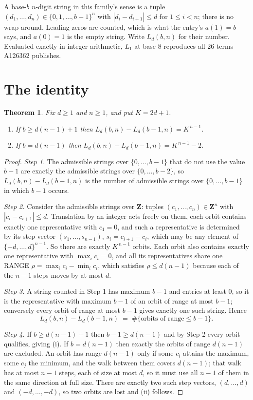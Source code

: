 \documentclass[11pt,a4paper]{article}
\theoremstyle{plain}
\newtheorem{theorem}{Theorem}
\theoremstyle{definition}
\begin{document}
A base-$b$ $n$-digit string in this family's sense is a tuple
$(d_1,\dots,d_n)\in\{0,1,\dots,b-1\}^{n}$ with $|d_i-d_{i+1}|\le d$ for $1\le i<n$; there
is no wrap-around. Leading zeros are counted, which is what the entry's $a(1)=b$ says, and
$a(0)=1$ is the empty string. Write $L_d(b,n)$ for their number. Evaluated exactly in integer
arithmetic, $L_{1}$ at base $8$ reproduces all $26$ terms A126362 publishes.

\section{The identity}

\begin{theorem}
Fix $d\ge1$ and $n\ge1$, and put $K=2d+1$.
\begin{enumerate}
\item[(i)] If $b\ge d(n-1)+1$ then $L_d(b,n)-L_d(b-1,n)=K^{\,n-1}$.
\item[(ii)] If $b=d(n-1)$ then $L_d(b,n)-L_d(b-1,n)=K^{\,n-1}-2$.
\end{enumerate}
\end{theorem}

\begin{proof}
\emph{Step 1.} The admissible strings over $\{0,\dots,b-1\}$ that do not use the value $b-1$
are exactly the admissible strings over $\{0,\dots,b-2\}$, so $L_d(b,n)-L_d(b-1,n)$ is the
number of admissible strings over $\{0,\dots,b-1\}$ in which $b-1$ occurs.

\emph{Step 2.} Consider the admissible strings over $\mathbf{Z}$: tuples
$(c_1,\dots,c_n)\in\mathbf{Z}^{n}$ with $|c_i-c_{i+1}|\le d$. Translation by an integer acts
freely on them, each orbit contains exactly one representative with $c_1=0$, and such a
representative is determined by its step vector $(s_1,\dots,s_{n-1})$, $s_i=c_{i+1}-c_i$,
which may be any element of $\{-d,\dots,d\}^{n-1}$. So there are exactly $K^{\,n-1}$ orbits.
Each orbit also contains exactly one representative with $\max_i c_i=0$, and all its
representatives share one RANGE $\rho=\max_ic_i-\min_ic_i$, which satisfies
$\rho\le d(n-1)$ because each of the $n-1$ steps moves by at most $d$.

\emph{Step 3.} A string counted in Step 1 has maximum $b-1$ and entries at least $0$, so it is
the representative with maximum $b-1$ of an orbit of range at most $b-1$; conversely every orbit
of range at most $b-1$ gives exactly one such string. Hence
\[
L_d(b,n)-L_d(b-1,n)\;=\;\#\{\text{orbits of range}\le b-1\} .
\]

\emph{Step 4.} If $b\ge d(n-1)+1$ then $b-1\ge d(n-1)$ and by Step 2 every orbit qualifies,
giving (i). If $b=d(n-1)$ then exactly the orbits of range $d(n-1)$ are excluded. An orbit has
range $d(n-1)$ only if some $c_i$ attains the maximum, some $c_j$ the minimum, and the walk
between them covers $d(n-1)$; that walk has at most $n-1$ steps, each of size at most $d$, so it
must use all $n-1$ of them in the same direction at full size. There are exactly two such step
vectors, $(d,\dots,d)$ and $(-d,\dots,-d)$, so two orbits are lost and (ii) follows.
\end{proof}
\end{document}
